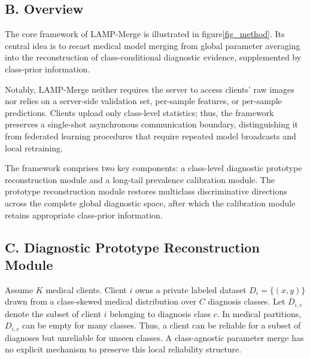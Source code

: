 \documentclass[letterpaper]{article} %
\begin{document}
\subsection{B. Overview}

The core framework of LAMP-Merge is illustrated in figure\ref{fig_method}. Its central idea is to recast medical model merging from global parameter averaging into the reconstruction of class-conditional diagnostic evidence, supplemented by class-prior information.

Notably, LAMP-Merge neither requires the server to access clients’ raw images nor relies on a server-side validation set, per-sample features, or per-sample predictions. Clients upload only class-level statistics; thus, the framework preserves a single-shot asynchronous communication boundary, distinguishing it from federated learning procedures that require repeated model broadcasts and local retraining.

The framework comprises two key components: a class-level diagnostic prototype reconstruction module and a long-tail prevalence calibration module. The prototype reconstruction module restores multiclass discriminative directions across the complete global diagnostic space, after which the calibration module retains appropriate class-prior information.

\subsection{C. Diagnostic Prototype Reconstruction Module}
Assume $K$ medical clients. Client $i$ owns a private labeled dataset $D_i=\{(x,y)\}$ drawn from a class-skewed medical distribution over $C$ diagnosis classes. Let $D_{i,c}$ denote the subset of client $i$ belonging to diagnosis class $c$. In medical partitions, $D_{i,c}$ can be empty for many classes. Thus, a client can be reliable for a subset of diagnoses but unreliable for unseen classes. A class-agnostic parameter merge has no explicit mechanism to preserve this local reliability structure.
\end{document}
